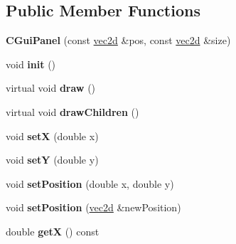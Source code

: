 \subsection*{Public Member Functions}
\begin{DoxyCompactItemize}
\item 
\hypertarget{class_c_gui_panel_a8110a738e143543ca3c7954793097e70}{
{\bfseries CGuiPanel} (const \hyperlink{classvec2d}{vec2d} \&pos, const \hyperlink{classvec2d}{vec2d} \&size)}
\label{class_c_gui_panel_a8110a738e143543ca3c7954793097e70}

\item 
\hypertarget{class_c_gui_panel_a3ce7a3603f1631c70f987e3d482132f4}{
void {\bfseries init} ()}
\label{class_c_gui_panel_a3ce7a3603f1631c70f987e3d482132f4}

\item 
\hypertarget{class_c_gui_panel_a33269f80691621af3072823d78d6a460}{
virtual void {\bfseries draw} ()}
\label{class_c_gui_panel_a33269f80691621af3072823d78d6a460}

\item 
\hypertarget{class_c_gui_panel_a10d81b5a153aa039e70df696c0b49780}{
virtual void {\bfseries drawChildren} ()}
\label{class_c_gui_panel_a10d81b5a153aa039e70df696c0b49780}

\item 
\hypertarget{class_c_gui_panel_a500909aeb573254a335bd62ff1898d7d}{
void {\bfseries setX} (double x)}
\label{class_c_gui_panel_a500909aeb573254a335bd62ff1898d7d}

\item 
\hypertarget{class_c_gui_panel_a4bb13f566a06d59ed13fd2b854f92fd5}{
void {\bfseries setY} (double y)}
\label{class_c_gui_panel_a4bb13f566a06d59ed13fd2b854f92fd5}

\item 
\hypertarget{class_c_gui_panel_a8aeb9a3555ea009e3c034016fca060c4}{
void {\bfseries setPosition} (double x, double y)}
\label{class_c_gui_panel_a8aeb9a3555ea009e3c034016fca060c4}

\item 
\hypertarget{class_c_gui_panel_a79f817833ef2f5a05177fe2e72f267ee}{
void {\bfseries setPosition} (\hyperlink{classvec2d}{vec2d} \&newPosition)}
\label{class_c_gui_panel_a79f817833ef2f5a05177fe2e72f267ee}

\item 
\hypertarget{class_c_gui_panel_ab171ac9172bab414f1fbb14c9e7676df}{
double {\bfseries getX} () const }
\label{class_c_gui_panel_ab171ac9172bab414f1fbb14c9e7676df}


\end{DoxyCompactItemize}
